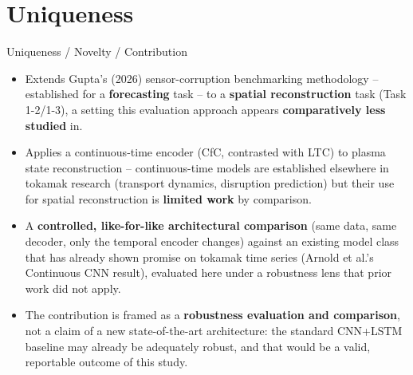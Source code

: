 \documentclass[aspectratio=169]{beamer}
\begin{document}
\section{Uniqueness}
\begin{frame}{Uniqueness / Novelty / Contribution}
  \begin{itemize}
    \item Extends Gupta's (2026) sensor-corruption benchmarking methodology
      -- established for a \textbf{forecasting} task -- to a
      \textbf{spatial reconstruction} task (Task 1-2/1-3), a setting this
      evaluation approach appears \textbf{comparatively less studied} in.
    \item Applies a continuous-time encoder (CfC, contrasted with LTC) to
      plasma state reconstruction -- continuous-time models are established
      elsewhere in tokamak research (transport dynamics, disruption
      prediction) but their use for spatial reconstruction is
      \textbf{limited work} by comparison.
    \item A \textbf{controlled, like-for-like architectural comparison}
      (same data, same decoder, only the temporal encoder changes) against
      an existing model class that has already shown promise on tokamak
      time series (Arnold et al.'s Continuous CNN result), evaluated here
      under a robustness lens that prior work did not apply.
    \item The contribution is framed as a \textbf{robustness evaluation and
      comparison}, not a claim of a new state-of-the-art architecture: the
      standard CNN+LSTM baseline may already be adequately robust, and that
      would be a valid, reportable outcome of this study.
  \end{itemize}
\end{frame}

\end{document}
